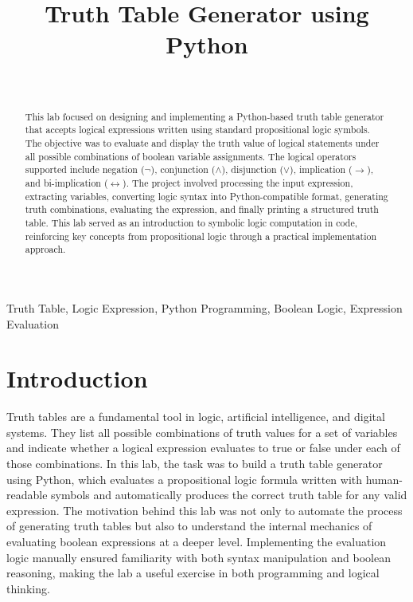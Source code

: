 \documentclass[a4paper, journal]{IEEEtran}
\begin{document}
\title{Truth Table Generator using Python}
\author{
 \\
}





\maketitle

\begin{abstract}
This lab focused on designing and implementing a Python-based truth table generator that accepts logical expressions written using standard propositional logic symbols. The objective was to evaluate and display the truth value of logical statements under all possible combinations of boolean variable assignments. The logical operators supported include negation ($\lnot$), conjunction ($\land$), disjunction ($\lor$), implication ($\rightarrow$), and bi-implication ($\leftrightarrow$). The project involved processing the input expression, extracting variables, converting logic syntax into Python-compatible format, generating truth combinations, evaluating the expression, and finally printing a structured truth table. This lab served as an introduction to symbolic logic computation in code, reinforcing key concepts from propositional logic through a practical implementation approach.
\end{abstract}

\begin{IEEEkeywords}
Truth Table, Logic Expression, Python Programming, Boolean Logic, Expression Evaluation
\end{IEEEkeywords}

\section{Introduction}
Truth tables are a fundamental tool in logic, artificial intelligence, and digital systems. They list all possible combinations of truth values for a set of variables and indicate whether a logical expression evaluates to true or false under each of those combinations. In this lab, the task was to build a truth table generator using Python, which evaluates a propositional logic formula written with human-readable symbols and automatically produces the correct truth table for any valid expression. The motivation behind this lab was not only to automate the process of generating truth tables but also to understand the internal mechanics of evaluating boolean expressions at a deeper level. Implementing the evaluation logic manually ensured familiarity with both syntax manipulation and boolean reasoning, making the lab a useful exercise in both programming and logical thinking.
\end{document}
